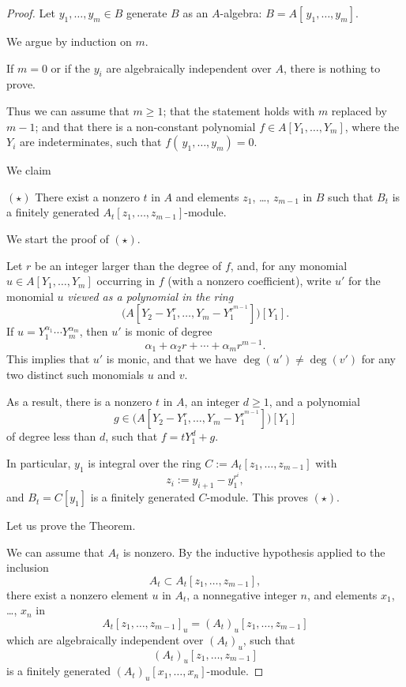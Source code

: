 \documentclass[parskip=half,fontsize=12pt]{scrartcl}%
\begin{document}
\begin{proof} 
Let $y_1,\dots,y_m\in B$ generate $B$ as an $A$-algebra: $B=A[\,y_1,\dots,y_m]$. 

We argue by induction on $m$. 

If $m=0$ or if the $y_i$ are algebraically independent over $A$, there is nothing to prove.

Thus we can assume that $m\ge1$; that the statement holds with $m$ replaced by $m-1$; and that there is a non-constant polynomial $f\in A[Y_1,\dots,Y_m]$, where the $Y_i$ are indeterminates, such that $f(\,y_1,\dots,y_m)=0$. %

We claim

$(\star)$ There exist a nonzero $t$ in $A$ and elements $z_1$, \dots, $z_{m-1}$ in $B$ such that $B_t$ is a finitely generated $A_t[z_1,\dots,z_{m-1}]$-module. 

We start the proof of $(\star)$. 

Let $r$ be an integer larger than the degree of $f$, and, for any monomial $u\in A[Y_1,\dots,Y_m]$ occurring in $f$ (with a nonzero coefficient), write $u'$ for the monomial $u$ \emph{viewed as a polynomial in the ring} 
$$
\bigg(A\left[Y_2-Y_1^r,\dots,Y_m-Y_1^{r^{m-1}}\right]\bigg)[Y_1].
$$ 
If $u=Y_1^{\alpha_1}\cdots Y_m^{\alpha_m}$, then $u'$ is monic of degree 
$$
\alpha_1+\alpha_2r+\cdots+\alpha_mr^{m-1}.
$$ 
This implies that $u'$ is monic, and that we have $\deg(u')\ne\deg(v')$ for any two distinct such monomials $u$ and $v$. %

As a result, there is a nonzero $t$ in $A$, an integer $d\ge1$, and a polynomial 
$$
g\in\bigg(A\left[Y_2-Y_1^r,\dots,Y_m-Y_1^{r^{m-1}}\right]\bigg)[Y_1]
$$ 
of degree less than $d$, such that $f=tY_1^d+g$. 

In particular, $y_1$ is integral over the ring $C:=A_t[z_1,\dots,z_{m-1}]$ 
with 
$$
z_i:=y_{i+1}-y_1^{r^i},
$$ 
and $B_t=C[y_1]$ is a finitely generated $C$-module. This proves $(\star)$.

Let us prove the Theorem.

We can assume that $A_t$ is nonzero. By the inductive hypothesis applied to the inclusion 
$$
A_t\subset A_t[z_1,\dots,z_{m-1}],
$$ 
there exist a nonzero element $u$ in $A_t$, a nonnegative integer $n$, and elements $x_1$, \dots, $x_n$ in 
$$
A_t[z_1,\dots,z_{m-1}]_u=(A_t)_u[z_1,\dots,z_{m-1}]
$$ 
which are algebraically independent over $(A_t)_u$, such that 
$$
(A_t)_u[z_1,\dots,z_{m-1}]
$$ 
is a finitely generated $(A_t)_u[x_1,\dots,x_n]$-module. 


\end{proof}
\end{document}
